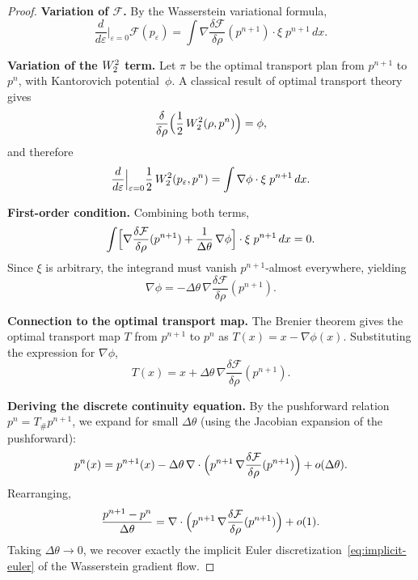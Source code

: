 \begin{proof}
\textbf{Variation of $\mathcal{F}$.}
By the Wasserstein variational formula,
\begin{equation}
\frac{d}{d\varepsilon}\Big|_{\varepsilon=0} \mathcal{F}(p_{\varepsilon})
  = \int \nabla\frac{\delta\mathcal{F}}{\delta\rho}(p^{n+1}) \cdot \xi\;
    p^{n+1}\,dx.
\end{equation}

\textbf{Variation of the $W_{2}^{2}$ term.}
Let $\pi$ be the optimal transport plan from $p^{n+1}$ to $p^{n}$, with Kantorovich
potential~$\phi$.
A classical result of optimal transport theory gives
\begin{equation}
\frac{\delta}{\delta\rho}\Bigl( \frac{1}{2}\,W_{2}^{2}(\rho, p^{n}) \Bigr) = \phi,
\end{equation}
and therefore
\begin{equation}
\frac{d}{d\varepsilon}\Big|_{\varepsilon=0} \frac{1}{2}\,W_{2}^{2}(p_{\varepsilon}, p^{n})
  = \int \nabla\phi \cdot \xi\;
    p^{n+1}\,dx.
\end{equation}

\textbf{First-order condition.}
Combining both terms,
\begin{equation}
\int \Bigl[ \nabla\frac{\delta\mathcal{F}}{\delta\rho}(p^{n+1})
          + \frac{1}{\Delta\theta}\,\nabla\phi \Bigr] \cdot \xi\;
      p^{n+1}\,dx = 0.
\end{equation}
Since $\xi$ is arbitrary, the integrand must vanish $p^{n+1}$-almost everywhere, yielding
\begin{equation}
\label{eq:nabla-phi}
\nabla\phi = -\Delta\theta\,\nabla\frac{\delta\mathcal{F}}{\delta\rho}(p^{n+1}).
\end{equation}

\textbf{Connection to the optimal transport map.}
The Brenier theorem gives the optimal transport map $T$ from $p^{n+1}$ to $p^{n}$ as
$T(x) = x - \nabla\phi(x)$.
Substituting the expression for $\nabla\phi$,
\begin{equation}
T(x) = x + \Delta\theta\,\nabla\frac{\delta\mathcal{F}}{\delta\rho}(p^{n+1}).
\end{equation}

\textbf{Deriving the discrete continuity equation.}
By the pushforward relation $p^{n} = T_{\#}p^{n+1}$, we expand for small $\Delta\theta$
(using the Jacobian expansion of the pushforward):
\begin{equation}
p^{n}(x)
  = p^{n+1}(x)
    - \Delta\theta\,\nabla\cdot\Bigl( p^{n+1}\,\nabla\frac{\delta\mathcal{F}}{\delta\rho}(p^{n+1}) \Bigr)
    + o(\Delta\theta).
\end{equation}
Rearranging,
\begin{equation}
\frac{p^{n+1} - p^{n}}{\Delta\theta}
  = \nabla\cdot\Bigl( p^{n+1}\,\nabla\frac{\delta\mathcal{F}}{\delta\rho}(p^{n+1}) \Bigr) + o(1).
\end{equation}
Taking $\Delta\theta \to 0$, we recover exactly the implicit Euler discretization~\eqref{eq:implicit-euler}
of the Wasserstein gradient flow.


\end{proof}

